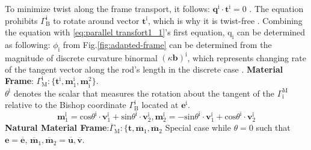 To minimize twist along the frame transport, it follows: $\textbf{q}^\text{i} \cdot \textbf{t}^\text{i} = 0$ .
The equation prohibits $\Gamma_\text{B}^\text{i}$ to rotate around vector $\textbf{t}^\text{i}$, which is why it is twist-free \cite{originalDER, kirchoff}. 
Combining the equation  with \eqref{eq:parallel transfort1_1}'s first equation, $\text{q}_\text{i}$ can be determined as following:
$\phi_\text{i}$ from Fig.\ref{fig:adapted-frame} can be determined from the magnitude of discrete curvature binormal $(\kappa\textbf{b})^\text{i}$, which represents changing rate of the tangent vector along the rod's length in the discrete case .
\textbf{Material Frame}: $\Gamma^\text{i}_\text{M}:{\{\boldsymbol{\textbf{t}}^\text{i}, \textbf{m}_1^\text{i}, \textbf{m}^2_\text{i}}\}$.\\
$\theta^\text{i}$ denotes the scalar that measures the rotation about the tangent of the  $\Gamma_\text{i}^\text{M}$ relative to the Bishop coordinate $\Gamma^\text{i}_\text{B}$ located at $\textbf{e}^\text{i}$. 
\begin{equation}
    \textbf{m}_1^\text{i}=\text{cos}\theta^\text{i}\cdot \textbf{v}_1^\text{i} + \text{sin}\theta^\text{i}\cdot \textbf{v}_2^\text{i}, \textbf{m}_2^\text{i}=-\text{sin}\theta^\text{i}\cdot \textbf{v}_1^\text{i} + \text{cos}\theta^\text{i}\cdot \textbf{v}_2^\text{i}
\end{equation}
\textbf{Natural Material Frame}:$\overline{\Gamma}_\text{M}:{\{\boldsymbol{\textbf{t}}, \overline{\textbf{m}}_1, \overline{\textbf{m}}_2}$ Special case while $\theta=0$ such that $\textbf{e} = \overline{\textbf{e}}$, $\overline{\textbf{m}}_1, \overline{\textbf{m}}_2=\overline{\textbf{u}}, \overline{\textbf{v}}$. \\
